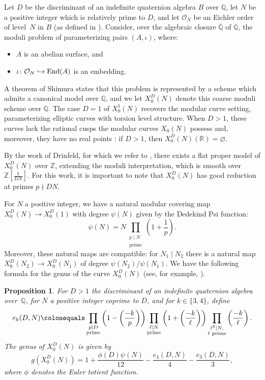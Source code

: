 \documentclass[11pt,reqno]{amsart}
\newcommand{\Q}{\mathbb{Q}}
\newcommand{\Z}{\mathbb{Z}}
\newtheorem{proposition}[theorem]{Proposition}
\theoremstyle{definition}
\begin{document}
Let $D$ be the discriminant of an indefinite quaternion algebra $B$ over $\mathbb{Q}$, let $N$ be a positive integer which is relatively prime to $D$, and let $\mathcal{O}_N$ be an Eichler order of level~$N$ in $B$ (as defined in \cite[\S 23.1.3]{Voight21}).
Consider, over the algebraic closure $\overline{\Q}$ of $\Q$, the moduli problem of parameterizing pairs $(A,\iota)$, where:
\begin{itemize}
    \item $A$ is an abelian surface, and
    \item $\iota\colon \mathcal{O}_N \hookrightarrow \textnormal{End}(A)$ is an embedding.
\end{itemize}
A theorem of Shimura \cite[Main Theorem 1]{Sh67} states that this problem is represented by a scheme which admits a canonical model over $\mathbb{Q}$, and we let $X_0^D(N)$ denote this coarse moduli scheme over $\mathbb{Q}$. The case $D=1$ of $X_0^{1}(N)$ recovers the modular curve setting, parameterizing elliptic curves with torsion level structure. When $D>1$, these curves lack the rational cusps the modular curves $X_0(N)$ possess and, moreover, they have no real points \cite[Theorem 0]{Sh75}: if $D>1$, then $X_0^D(N)(\mathbb{R}) = \varnothing$.

By the work of Drinfeld, for which we refer to \cite{BC91,Buzzard}, there exists a flat proper model of $X_0^D(N)$ over $\Z$, extending the moduli interpretation, which is smooth over $\Z\left[\tfrac{1}{DN}\right]$. For this work, it is important to note that $X_0^D(N)$ has good reduction at primes $p \nmid DN$.

For $N$ a positive integer, we have a natural modular covering map $X_0^D(N) \to X_0^D(1)$ with degree $\psi(N)$ given by the Dedekind Psi function:
\[ \psi(N) = N \prod_{\substack{p \mid N \\ \text{prime}}} \left(1+ \frac{1}{p}\right). \]
Moreover, these natural maps are compatible: for $N_1 \mid N_2$ there is a natural map $X_0^D(N_2) \to X_0^D(N_1)$ of degree $\psi(N_2)/\psi(N_1)$. 
We have the following formula for the genus of the curve $X_0^D(N)$ (see, for example, \cite[Thm. 39.4.20]{Voight21}).
\begin{proposition}\label{prop: genus_formula}
For $D>1$ the discriminant of an indefinite quaternion algebra over~$\Q$, for $N$ a positive integer coprime to $D$, and for $k \in \{3,4\}$, define
\[
e_k(D,N) \colonequals \prod_{\substack{p|D \\ \text{prime}}} \left(1 - \left(\frac{-k}{p}\right)\right) \prod_{\substack{\ell|N \\ \text{prime}}} \left(1 + \left(\frac{-k}{\ell}\right)\right) \prod_{\substack{\ell^2|N, \\ \ell \text{ prime}}}\left(\frac{-k}{\ell}\right) .
\]
The genus of $X_0^D(N)$ is given by
\[
g(X_0^D(N)) = 1 + \frac{\phi(D)\psi(N)}{12} - \frac{e_4(D,N)}{4} - \frac{e_3(D,N)}{3},
\]
where $\phi$ denotes the Euler totient function.
\end{proposition}
\end{document}
